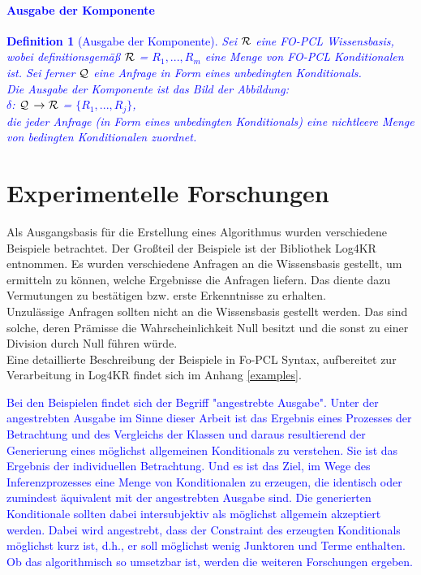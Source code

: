 \documentclass[a4paper, 11pt]{book}
\newtheorem{Def}{Definition }[section]
\begin{document}
\textcolor{blue}{
\subsubsection{Ausgabe der Komponente}
\begin{Def}[Ausgabe der Komponente]  \label{Ausgabe der Komponente}
	Sei $\cal{R}$ eine FO-PCL Wissensbasis, wobei definitionsgemäß $\cal{R}$  = $ {R_1, ..., R_m} $ eine Menge von FO-PCL Konditionalen ist. Sei ferner $ \cal{Q} $ eine Anfrage in Form eines unbedingten Konditionals.\\
	Die Ausgabe der Komponente ist das Bild der Abbildung:\\
		\hspace{3.0 cm} $ \delta $: $ \cal{Q}  $ $  \rightarrow  \cal{R}$  = $\{R_1, ..., R_j\} $,\\
		die jeder Anfrage (in Form eines unbedingten Konditionals) eine nichtleere Menge von bedingten Konditionalen zuordnet. 
	\end{Def}
}


	
\chapter{Experimentelle Forschungen} \label{Experim. Forschungen}
Als Ausgangsbasis für die Erstellung eines Algorithmus wurden verschiedene Beispiele betrachtet. Der Großteil der Beispiele ist der Bibliothek Log4KR entnommen. Es wurden verschiedene Anfragen an die Wissensbasis gestellt, um ermitteln zu können, welche Ergebnisse die Anfragen liefern. Das diente dazu Vermutungen zu bestätigen bzw. erste Erkenntnisse zu erhalten.\\
Unzulässige Anfragen sollten nicht an die Wissensbasis gestellt werden. Das sind solche, deren Prämisse die Wahrscheinlichkeit Null besitzt und die sonst zu einer Division durch Null führen würde.\\
Eine detaillierte Beschreibung der Beispiele in Fo-PCL Syntax, aufbereitet zur Verarbeitung in Log4KR findet sich im Anhang \ref{examples}.

\textcolor{blue}{
Bei den Beispielen findet sich der Begriff "{}angestrebte Ausgabe"{}. \label{angestrebte Ausgabe}
Unter der angestrebten Ausgabe im Sinne dieser Arbeit ist das Ergebnis eines Prozesses der Betrachtung und des Vergleichs der Klassen und daraus resultierend der Generierung eines möglichst allgemeinen Konditionals zu verstehen. Sie ist das Ergebnis der individuellen Betrachtung. Und es ist das Ziel, im Wege des Inferenzprozesses eine Menge von Konditionalen zu erzeugen, die identisch oder zumindest äquivalent mit der angestrebten Ausgabe sind.  Die generierten Konditionale sollten dabei intersubjektiv als möglichst allgemein akzeptiert werden. Dabei wird angestrebt, dass der Constraint des erzeugten Konditionals möglichst kurz ist, d.h., er soll möglichst wenig Junktoren und Terme enthalten. Ob das algorithmisch so umsetzbar ist, werden die weiteren Forschungen ergeben. 
}
\end{document}
